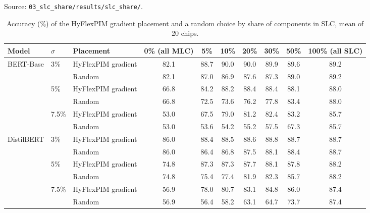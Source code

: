 \noindent Source: \nolinkurl{03_slc_share/results/slc_share/}.
\begin{table}[H]
\centering\footnotesize
\caption{Accuracy (\%) of the HyFlexPIM gradient placement and a random choice by share of components in SLC, mean of 20 chips.}
\begin{tabular}{@{}lllccccccc@{}}
\toprule
Model & $\sigma$ & Placement & 0\% (all MLC) & 5\% & 10\% & 20\% & 30\% & 50\% & 100\% (all SLC) \\
\midrule
\multirow{6}{*}{BERT-Base} & 3\% & HyFlexPIM gradient & 82.1 & 88.7 & 90.0 & 90.0 & 89.9 & 89.6 & 89.2 \\
 &  & Random & 82.1 & 87.0 & 86.9 & 87.6 & 87.3 & 89.0 & 89.2 \\
\cmidrule(l){2-10}
 & 5\% & HyFlexPIM gradient & 66.8 & 84.2 & 88.2 & 88.4 & 88.4 & 88.1 & 88.0 \\
 &  & Random & 66.8 & 72.5 & 73.6 & 76.2 & 77.8 & 83.4 & 88.0 \\
\cmidrule(l){2-10}
 & 7.5\% & HyFlexPIM gradient & 53.0 & 67.5 & 79.0 & 81.2 & 82.4 & 83.2 & 85.7 \\
 &  & Random & 53.0 & 53.6 & 54.2 & 55.2 & 57.5 & 67.3 & 85.7 \\
\midrule
\multirow{6}{*}{DistilBERT} & 3\% & HyFlexPIM gradient & 86.0 & 88.4 & 88.5 & 88.6 & 88.8 & 88.7 & 88.7 \\
 &  & Random & 86.0 & 86.4 & 86.8 & 87.5 & 88.1 & 88.4 & 88.7 \\
\cmidrule(l){2-10}
 & 5\% & HyFlexPIM gradient & 74.8 & 87.3 & 87.3 & 87.7 & 88.1 & 87.8 & 88.2 \\
 &  & Random & 74.8 & 75.4 & 77.4 & 81.9 & 82.3 & 85.7 & 88.2 \\
\cmidrule(l){2-10}
 & 7.5\% & HyFlexPIM gradient & 56.9 & 78.0 & 80.7 & 83.1 & 84.8 & 86.0 & 87.4 \\
 &  & Random & 56.9 & 56.4 & 58.2 & 63.1 & 64.7 & 73.7 & 87.4 \\
\bottomrule
\end{tabular}
\end{table}
